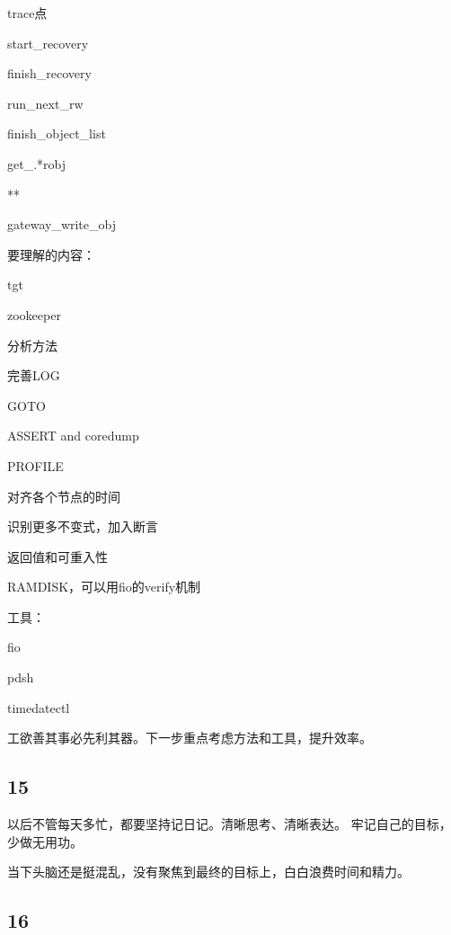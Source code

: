trace点
\begin{enumbox}
\item start\_recovery
\item finish\_recovery
\item run\_next\_rw
\item finish\_object\_list
\item get\_.*robj
\item ***
\item gateway\_write\_obj
\end{enumbox}

要理解的内容：
\begin{enumbox}
\item tgt
\item zookeeper
\end{enumbox}

分析方法
\begin{enumbox}
\item 完善LOG
\item GOTO
\item ASSERT and coredump
\item PROFILE
\item 对齐各个节点的时间
\item 识别更多不变式，加入断言
\item 返回值和可重入性
\item RAMDISK，可以用fio的verify机制
\end{enumbox}

工具：
\begin{enumbox}
\item fio
\item pdsh
\item timedatectl
\end{enumbox}

工欲善其事必先利其器。下一步重点考虑方法和工具，提升效率。

\subsection{15}

以后不管每天多忙，都要坚持记日记。清晰思考、清晰表达。
牢记自己的目标，少做无用功。

当下头脑还是挺混乱，没有聚焦到最终的目标上，白白浪费时间和精力。

\subsection{16}


